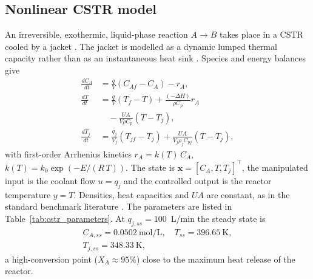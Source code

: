 \subsection{Nonlinear CSTR model}
An irreversible, exothermic, liquid-phase reaction $A \rightarrow B$ takes place in a CSTR cooled by a jacket \cite{luyben2007chemical, seborg2010process}. The jacket is modelled as a dynamic lumped thermal capacity rather than as an instantaneous heat sink \cite{uppal1974dynamic}. Species and energy balances give
\begin{align}
    \frac{dC_A}{dt} &= \frac{q}{V}(C_{Af} - C_A) - r_A, \label{eq:cstr_ca} \\
    \frac{dT}{dt}   &= \frac{q}{V}(T_f - T) + \frac{(-\Delta H)}{\rho C_p} r_A \nonumber \\
                    &\quad - \frac{UA}{V \rho C_p}(T - T_j), \label{eq:cstr_t} \\
    \frac{dT_j}{dt} &= \frac{q_j}{V_j}(T_{jf} - T_j) + \frac{UA}{V_j \rho_j C_{pj}}(T - T_j), \label{eq:cstr_tj}
\end{align}
with first-order Arrhenius kinetics $r_A = k(T)\,C_A$, $k(T) = k_0 \exp(-E/(R\,T))$. The state is $\mathbf{x} = [C_A, T, T_j]^\top$, the manipulated input is the coolant flow $u = q_j$ and the controlled output is the reactor temperature $y = T$. Densities, heat capacities and $UA$ are constant, as in the standard benchmark literature \cite{uppal1974dynamic, seborg2010process}. The parameters are listed in Table~\ref{tab:cstr_parameters}. At $q_{j,ss} = 100$~L/min the steady state is
\begin{equation}
    \begin{gathered}
    C_{A,ss} = 0.0502~\text{mol/L}, \quad T_{ss} = 396.65~\text{K}, \\
    T_{j,ss} = 348.33~\text{K},
    \end{gathered}
    \label{eq:nominal_ss}
\end{equation}
a high-conversion point ($X_A \approx 95\%$) close to the maximum heat release of the reactor.

